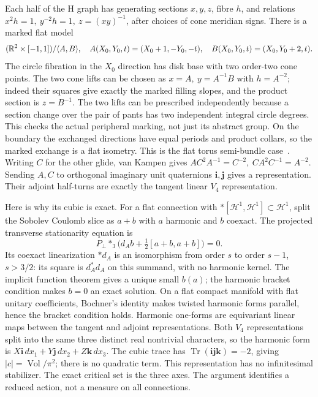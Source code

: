 Each half of the H graph has generating sections \(x,y,z\), fibre \(h\), and relations \(x^2 h=1,\ y^{-2}h=1,\ z=(xy)^{-1}\), after choices of cone meridian signs. There is a marked flat model
\[
 (\mathbb R^2\times[-1,1])/\langle A,B\rangle,\quad
 A(X_0,Y_0,t)=(X_0+1,-Y_0,-t),\quad B(X_0,Y_0,t)=(X_0,Y_0+2,t).
\]
The circle fibration in the \(X_0\) direction has disk base with two order-two cone points. The two cone lifts can be chosen as \(x=A,\ y=A^{-1}B\) with \(h=A^{-2}\); indeed their squares give exactly the marked filling slopes, and the product section is \(z=B^{-1}\). The two lifts can be prescribed independently because a section change over the pair of pants has two independent integral circle degrees. This checks the actual peripheral marking, not just its abstract group. On the boundary the exchanged directions have equal periods and product collars, so the marked exchange is a flat isometry. This is the flat torus semi-bundle case~\cite{SWW}. Writing \(C\) for the other glide, van Kampen gives \(AC^2A^{-1}=C^{-2},\ CA^2C^{-1}=A^{-2}\). Sending \(A,C\) to orthogonal imaginary unit quaternions \(\mathbf i,\mathbf j\) gives a representation. Their adjoint half-turns are exactly the tangent linear \(V_4\) representation.

Here is why its cubic is exact. For a flat connection with \(*[\mathcal H^1,\mathcal H^1]\subset\mathcal H^1\), split the Sobolev Coulomb slice as \(a+b\) with \(a\) harmonic and \(b\) coexact. The projected transverse stationarity equation is
\[
 P_{\perp}*_3\big(d_A b+\tfrac12[a+b,a+b]\big)=0 .
\]
Its coexact linearization \(*d_A\) is an isomorphism from order \(s\) to order \(s-1\), \(s>3/2\): its square is \(d_A^*d_A\) on this summand, with no harmonic kernel. The implicit function theorem gives a unique small \(b(a)\); the harmonic bracket condition makes \(b=0\) an exact solution. On a flat compact manifold with flat unitary coefficients, Bochner's identity makes twisted harmonic forms parallel, hence the bracket condition holds. Harmonic one-forms are equivariant linear maps between the tangent and adjoint representations. Both \(V_4\) representations split into the same three distinct real nontrivial characters, so the harmonic form is \(X\mathbf i\,dx_1+Y\mathbf j\,dx_2+Z\mathbf k\,dx_3\). The cubic trace has \(\operatorname{Tr}(\mathbf i\mathbf j\mathbf k)=-2\), giving \(|c|=\operatorname{Vol}/\pi^2\); there is no quadratic term. This representation has no infinitesimal stabilizer. The exact critical set is the three axes. The argument identifies a reduced action, not a measure on all connections.

